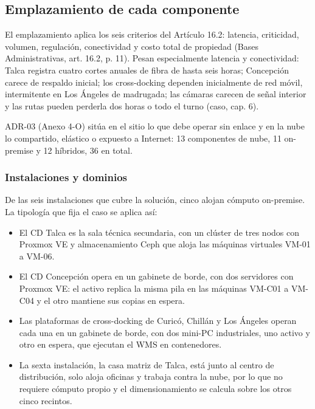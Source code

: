 %

\subsection{Emplazamiento de cada componente}
\label{fuente-02-a-emplazamiento}
\label{sec:emplazamiento}

El emplazamiento aplica los seis criterios del Artículo 16.2: latencia, criticidad, volumen, regulación, conectividad y costo total de propiedad (Bases Administrativas, art. 16.2, p. 11). Pesan especialmente latencia y conectividad: Talca registra cuatro cortes anuales de fibra de hasta seis horas; Concepción carece de respaldo inicial; los cross-docking dependen inicialmente de red móvil, intermitente en Los Ángeles de madrugada; las cámaras carecen de señal interior y las rutas pueden perderla dos horas o todo el turno (caso, cap. 6).

ADR-03 (Anexo 4-O) sitúa en el sitio lo que debe operar sin enlace y en la nube lo compartido, elástico o expuesto a Internet: 13 componentes de nube, 11 on-premise y 12 híbridos, 36 en total.

\subsubsection{Instalaciones y dominios}

De las seis instalaciones que cubre la solución, cinco alojan cómputo on-premise. La tipología que fija el caso se aplica así:

\begin{itemize}
  \item El CD Talca es la sala técnica secundaria, con un clúster de tres nodos con Proxmox VE y almacenamiento Ceph que aloja las máquinas virtuales VM-01 a VM-06.
  \item El CD Concepción opera en un gabinete de borde, con dos servidores con Proxmox VE: el activo replica la misma pila en las máquinas VM-C01 a VM-C04 y el otro mantiene sus copias en espera.
  \item Las plataformas de cross-docking de Curicó, Chillán y Los Ángeles operan cada una en un gabinete de borde, con dos mini-PC industriales, uno activo y otro en espera, que ejecutan el WMS en contenedores.
  \item La sexta instalación, la casa matriz de Talca, está junto al centro de distribución, solo aloja oficinas y trabaja contra la nube, por lo que no requiere cómputo propio y el dimensionamiento se calcula sobre los otros cinco recintos.
\end{itemize}

